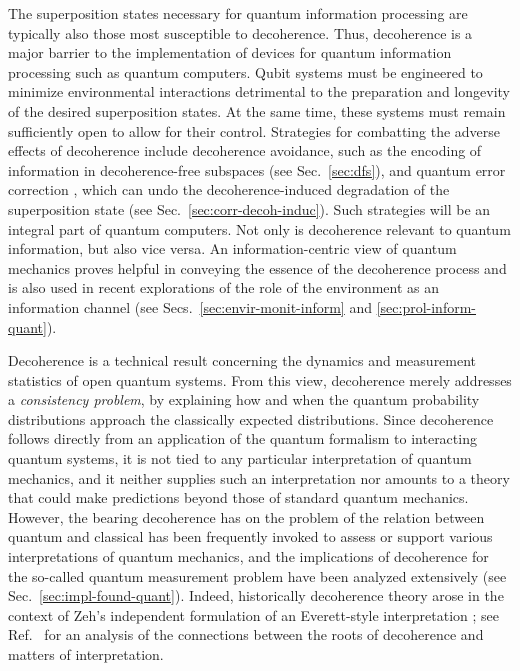 \documentclass[3p,sort&compress]{elsarticle}
\begin{document}
The superposition states necessary for quantum information processing are typically also those most susceptible to decoherence. Thus, decoherence is a major barrier to the implementation of devices for quantum information processing such as quantum computers. Qubit systems must be engineered to minimize environmental interactions detrimental to the preparation and longevity of the desired superposition states. At the same time, these systems must remain sufficiently open to allow for their control. Strategies for combatting the adverse effects of decoherence include decoherence avoidance, such as the encoding of information in decoherence-free subspaces (see Sec.~\ref{sec:dfs}), and quantum error correction \cite{Lidar:2013:pp}, which can undo the decoherence-induced degradation of the superposition state (see Sec.~\ref{sec:corr-decoh-induc}). Such strategies will be an integral part of quantum computers. Not only is decoherence relevant to quantum information, but also vice versa. An information-centric view of quantum mechanics proves helpful in conveying the essence of the decoherence process and is also used in recent explorations of the role of the environment as an information channel (see Secs.~\ref{sec:envir-monit-inform} and \ref{sec:prol-inform-quant}).

Decoherence is a technical result concerning the dynamics and measurement statistics of open quantum systems. From this view, decoherence merely addresses a \emph{consistency problem}, by explaining how and when the quantum probability distributions approach the classically expected distributions. Since decoherence follows directly from an application of the quantum formalism to interacting quantum systems, it is not tied to any particular interpretation of quantum mechanics, and it neither supplies such an interpretation nor amounts to a theory that could make predictions beyond those of standard quantum mechanics.  However, the bearing decoherence has on the problem of the relation between quantum and classical has been frequently invoked to assess or support various interpretations of quantum mechanics, and the implications of decoherence for the so-called quantum measurement problem have been analyzed extensively (see Sec.~\ref{sec:impl-found-quant}). Indeed, historically decoherence theory arose in the context of Zeh's independent formulation of an Everett-style interpretation \cite{Zeh:1970:yt}; see Ref.~\cite{Camilleri:2009:aq} for an analysis of the connections between the roots of decoherence and matters of interpretation.
\end{document}
